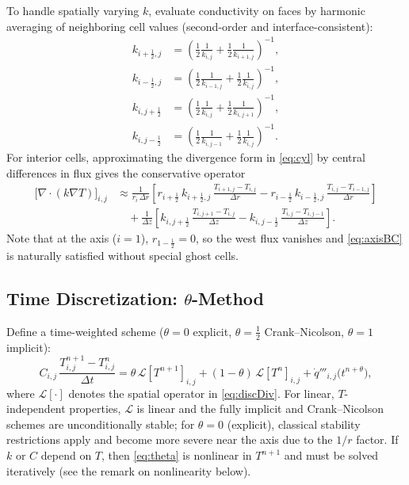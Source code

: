 \documentclass[11pt]{article}
\begin{document}
To handle spatially varying $k$, evaluate conductivity on faces by harmonic averaging of neighboring cell values (second-order and interface-consistent):
\begin{align}
k_{i+\frac{1}{2},j}
&=\left(\frac{1}{2}\frac{1}{k_{i,j}}+\frac{1}{2}\frac{1}{k_{i+1,j}}\right)^{-1},\\
k_{i-\frac{1}{2},j}
&=\left(\frac{1}{2}\frac{1}{k_{i-1,j}}+\frac{1}{2}\frac{1}{k_{i,j}}\right)^{-1},\\
k_{i,j+\frac{1}{2}}
&=\left(\frac{1}{2}\frac{1}{k_{i,j}}+\frac{1}{2}\frac{1}{k_{i,j+1}}\right)^{-1},\\
k_{i,j-\frac{1}{2}}
&=\left(\frac{1}{2}\frac{1}{k_{i,j-1}}+\frac{1}{2}\frac{1}{k_{i,j}}\right)^{-1}.
\end{align}
For interior cells, approximating the divergence form in \eqref{eq:cyl} by central differences in flux gives the conservative operator
\begin{align}
\big[\nabla\cdot(k\nabla T)\big]_{i,j}
&\approx
\frac{1}{r_i\,\Delta r}\left[
r_{i+\frac{1}{2}}\,k_{i+\frac{1}{2},j}\,\frac{T_{i+1,j}-T_{i,j}}{\Delta r}
-
r_{i-\frac{1}{2}}\,k_{i-\frac{1}{2},j}\,\frac{T_{i,j}-T_{i-1,j}}{\Delta r}
\right]
\nonumber\\
&\quad
+\frac{1}{\Delta z}\left[
k_{i,j+\frac{1}{2}}\,\frac{T_{i,j+1}-T_{i,j}}{\Delta z}
-
k_{i,j-\frac{1}{2}}\,\frac{T_{i,j}-T_{i,j-1}}{\Delta z}
\right].
\label{eq:discDiv}
\end{align}
Note that at the axis ($i=1$), $r_{1-\frac{1}{2}}=0$, so the west flux vanishes and \eqref{eq:axisBC} is naturally satisfied without special ghost cells.

\subsection{Time Discretization: $\theta$-Method}

Define a time-weighted scheme ($\theta=0$ explicit, $\theta=\tfrac{1}{2}$ Crank--Nicolson, $\theta=1$ implicit):
\begin{equation}
C_{i,j}\,\frac{T_{i,j}^{n+1}-T_{i,j}^n}{\Delta t}
= \theta\,\mathcal{L}[T^{n+1}]_{i,j} + (1-\theta)\,\mathcal{L}[T^{n}]_{i,j} + \dot{q}'''_{i,j}\big(t^{n+\theta}\big),
\label{eq:theta}
\end{equation}
where $\mathcal{L}[\cdot]$ denotes the spatial operator in \eqref{eq:discDiv}. For linear, $T$-independent properties, $\mathcal{L}$ is linear and the fully implicit and Crank--Nicolson schemes are unconditionally stable; for $\theta=0$ (explicit), classical stability restrictions apply and become more severe near the axis due to the $1/r$ factor. If $k$ or $C$ depend on $T$, then \eqref{eq:theta} is nonlinear in $T^{n+1}$ and must be solved iteratively (see the remark on nonlinearity below).
\end{document}
